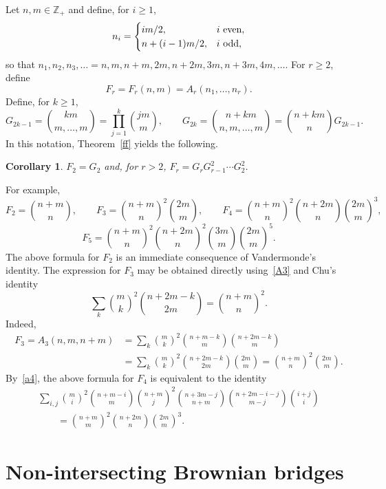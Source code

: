 \documentclass[pdftex]{sigma}
\newtheorem{cor}[thm]{Corollary}
\theoremstyle{definition}
\newcommand\Z{{\mathbb Z}}
\begin{document}
Let $n,m\in\Z_+$ and define, for $i\ge 1$,
\[
n_i=\begin{cases} im/2, & i \mbox{ \rm even},\\ n+(i-1)m/2, & i \mbox{ \rm odd},\end{cases}\]
so that
$n_1,n_2,n_3,\ldots =n,m,n+m,2m,n+2m,3m,n+3m,4m,\ldots$.
For $r\ge 2$, define \[F_r=F_r(n,m)=A_r(n_1,\dots,n_r).\]
Define, for $k\ge 1$,
\[G_{2k-1}={km \choose m,\dots,m}=\prod_{j=1}^k {jm \choose m},\qquad G_{2k}={n+km \choose n,m,\dots,m}={n+km \choose n} G_{2k-1}.\]
In this notation, Theorem~\ref{ff} yields the following.
\begin{cor}
$F_2=G_2$ and, for $r> 2$,
$F_r=G_{r} G_{r-1}^2 \cdots G_2^2$.
\end{cor}
For example,
\[F_2={n+m \choose n}, \qquad F_3={n+m \choose n}^2 {2m \choose m},\qquad
F_4={n+m \choose n}^2 {n+2m \choose n} {2m \choose m}^3,\]
\[F_5={n+m \choose n}^2 {n+2m \choose n}^2 {3m \choose m} {2m \choose m}^5.\]
The above formula for $F_2$ is an immediate consequence of
Vandermonde's identity. The expression for $F_3$ may be obtained directly
using~\eqref{A3} and Chu's identity
\[\sum_k {m \choose k}^2 {n+2m-k \choose 2m} = {n+m \choose n}^2.\]
Indeed,
\begin{align*}
F_3=A_3(n,m,n+m) &= \sum_k {m \choose k}^2 {n+m-k \choose m} {n+2m-k \choose m}\\
&= \sum_k {m \choose k}^2 {n+2m-k \choose 2m} {2m \choose m} = {n+m \choose n}^2 {2m \choose m}.
\end{align*}
By~\eqref{a4}, the above formula for $F_4$ is equivalent to the identity
\begin{gather*}
\sum_{i,j}
{m \choose i}^2 {n+m-i \choose m} {n+m \choose j}^2 {n+3m-j \choose n+m}
{n+2m-i-j \choose m-j} {i+j \choose i} \\
\qquad= {n+m \choose m}^2 {n+2m \choose n} {2m \choose m}^3.
\end{gather*}

\section{Non-intersecting Brownian bridges}\label{nibb}
\end{document}

